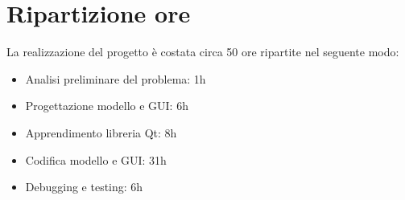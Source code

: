 
    \section*{Ripartizione ore}
        La realizzazione del progetto è costata circa 50 ore ripartite nel seguente modo:
        \begin{itemize}
            \item Analisi preliminare del problema: 1h
            \item Progettazione modello e GUI: 6h
            \item Apprendimento libreria Qt: 8h
            \item Codifica modello e GUI: 31h
            \item Debugging e testing: 6h
        \end{itemize}

